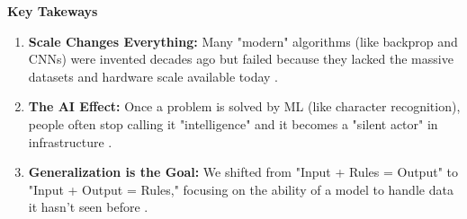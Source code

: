 \documentclass{report}
\newcommand{\kt}[1]{
	\begin{center}
		{\bfseries \textcolor{tnCyan}{Key Takeways}}
	\end{center}
	
	\vspace{6pt}
	
	{\color{tnCyan}
		#1
	}
	
	\vspace{12pt}}
\begin{document}
\kt{
	\begin{enumerate}
		\item \textbf{Scale Changes Everything:} Many "modern" algorithms (like backprop and CNNs) were invented decades ago but failed because they lacked the massive datasets and hardware scale available today
		.
		\item \textbf{The AI Effect:} Once a problem is solved by ML (like character recognition), people often stop calling it "intelligence" and it becomes a "silent actor" in infrastructure
		.
		\item \textbf{Generalization is the Goal:} We shifted from "Input + Rules = Output" to "Input + Output = Rules," focusing on the ability of a model to handle data it hasn't seen before
		.
	\end{enumerate}}
\end{document}
